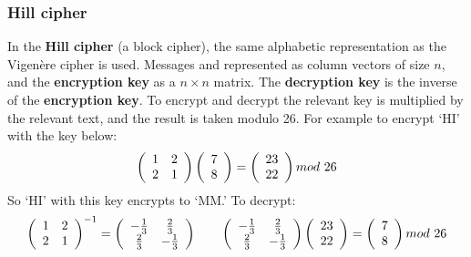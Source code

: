 \documentclass{article}
\begin{document}
\subsubsection{Hill cipher}
In the \textbf{Hill cipher} (a block cipher), the same alphabetic representation as the Vigen\`{e}re cipher is used. Messages and represented as column vectors of size $ n $, and the \textbf{encryption key} as a $ n \times n $ matrix. The \textbf{decryption key} is the inverse of the \textbf{encryption key}. To encrypt and decrypt the relevant key is multiplied by the relevant text, and the result is taken modulo 26. For example to encrypt `HI' with the key below:
\[
	\left(
	\begin{array}{c c}
		1 & 2 \\
		2 & 1
	\end{array}
	\right)
	\left(
	\begin{array}{c}
		7 \\
		8
	\end{array}
	\right)
	=
	\left(
	\begin{array}{c}
		23 \\
		22
	\end{array}
	\right)
	mod\ 26
\]
So `HI' with this key encrypts to `MM.' To decrypt:
\[
	\left(
	\begin{array}{c c}
		1 & 2 \\
		2 & 1
	\end{array}
	\right)^{-1}
	=
	\left(
	\begin{array}{c c}
		-\frac{1}{3} & \frac{2}{3} \\
		\frac{2}{3} & -\frac{1}{3}
	\end{array}
	\right)
	\hspace{20pt}
	\left(
	\begin{array}{c c}
		-\frac{1}{3} & \frac{2}{3} \\
		\frac{2}{3} & -\frac{1}{3}
	\end{array}
	\right)
	\left(
	\begin{array}{c}
		23 \\
		22
	\end{array}
	\right)
	=
	\left(
	\begin{array}{c}
		7 \\
		8
	\end{array}
	\right)
	mod\ 26
\]
\end{document}
